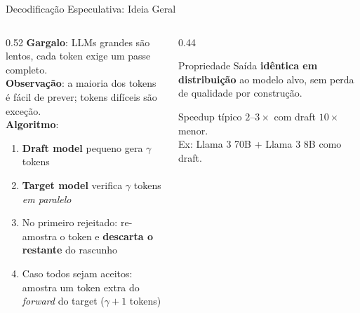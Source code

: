 \documentclass[aspectratio=169, xcolor=dvipsnames]{beamer}
\begin{document}
  \begin{frame}{Decodificação Especulativa: Ideia Geral \cite{leviathan2023speculative}}
    \small
    \begin{columns}[T]
      \begin{column}{0.52\textwidth}
        \textbf{Gargalo}: LLMs grandes são lentos, cada token exige um passe completo.\\[0.4em]
        \textbf{Observação}: a maioria dos tokens é fácil de prever; tokens difíceis são exceção.\\[0.4em]
        \textbf{Algoritmo}:
        \begin{enumerate}
          \item \textbf{Draft model} pequeno gera $\gamma$ tokens
          \item \textbf{Target model} verifica $\gamma$ tokens \textit{em paralelo}
          \item No primeiro rejeitado: re-amostra o token e \textbf{descarta o restante} do rascunho
          \item Caso todos sejam aceitos: amostra um token extra do \textit{forward} do target ($\gamma + 1$ tokens)
        \end{enumerate}
      \end{column}
      \begin{column}{0.44\textwidth}
        \begin{block}{Propriedade}
          Saída \textbf{idêntica em distribuição} ao modelo alvo, sem perda de qualidade por construção.
        \end{block}
        \vspace{0.3em}
        \begin{exampleblock}{Speedup típico}
          $2$--$3\times$ com draft $10\times$ menor.\\
          Ex: Llama 3 70B + Llama 3 8B como draft.
        \end{exampleblock}
      \end{column}
    \end{columns}
  \end{frame}
\end{document}
